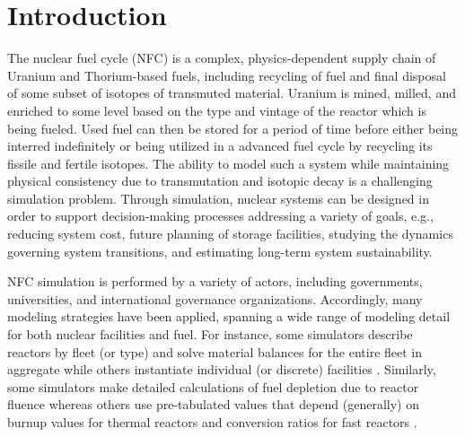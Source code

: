\section{Introduction}

The nuclear fuel cycle (NFC) is a complex, physics-dependent supply chain of
Uranium and Thorium-based fuels, including recycling of fuel and final disposal
of some subset of isotopes of transmuted material. Uranium is mined, milled, and
enriched to some level based on the type and vintage of the reactor
which is being fueled. Used fuel can then be stored for a period of time before
either being interred indefinitely or being utilized in a advanced fuel cycle by
recycling its fissile and fertile isotopes. The ability to model such a system
while maintaining physical consistency due to transmutation and isotopic decay
is a challenging simulation problem. Through simulation, nuclear systems can be
designed in order to support decision-making processes addressing a variety of
goals, e.g., reducing system cost, future planning of storage facilities,
studying the dynamics governing system transitions, and estimating long-term
system sustainability.

NFC simulation is performed by a variety of actors, including governments,
universities, and international governance organizations. Accordingly, many
modeling strategies have been applied, spanning a wide range of modeling detail
for both nuclear facilities and fuel. For instance, some simulators describe
reactors by fleet (or type) and solve material balances for the entire fleet in
aggregate \cite{busquim_e_silva_system_2008, durpel_daness_2003,
  yacout_vision_2006} while others instantiate individual (or discrete)
facilities \cite{schneider_nfcsim:_2005}. Similarly, some simulators make
detailed calculations of fuel depletion due to reactor fluence
\cite{boucher_cosi:_2006, mouginot2012class} whereas others use pre-tabulated
values that depend (generally) on burnup values for thermal reactors and
conversion ratios for fast reactors \cite{yacout_vision_2006}.


